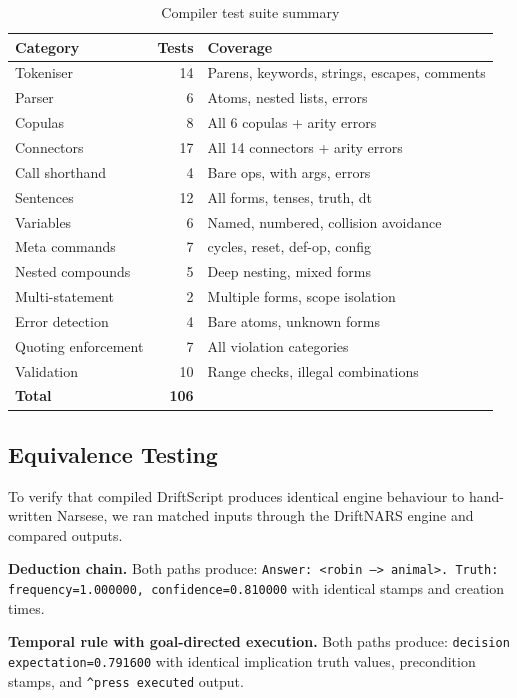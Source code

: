 \documentclass[11pt,a4paper]{article}
\begin{document}
\begin{table}[h]
\centering
\caption{Compiler test suite summary}
\label{tab:tests}
\begin{tabular}{lrl}
\toprule
\textbf{Category} & \textbf{Tests} & \textbf{Coverage} \\
\midrule
Tokeniser & 14 & Parens, keywords, strings, escapes, comments \\
Parser & 6 & Atoms, nested lists, errors \\
Copulas & 8 & All 6 copulas + arity errors \\
Connectors & 17 & All 14 connectors + arity errors \\
Call shorthand & 4 & Bare ops, with args, errors \\
Sentences & 12 & All forms, tenses, truth, dt \\
Variables & 6 & Named, numbered, collision avoidance \\
Meta commands & 7 & cycles, reset, def-op, config \\
Nested compounds & 5 & Deep nesting, mixed forms \\
Multi-statement & 2 & Multiple forms, scope isolation \\
Error detection & 4 & Bare atoms, unknown forms \\
Quoting enforcement & 7 & All violation categories \\
Validation & 10 & Range checks, illegal combinations \\
\midrule
\textbf{Total} & \textbf{106} & \\
\bottomrule
\end{tabular}
\end{table}

\subsection{Equivalence Testing}

To verify that compiled DriftScript produces identical engine behaviour to
hand-written Narsese, we ran matched inputs through the DriftNARS engine and
compared outputs.

\textbf{Deduction chain.} Both paths produce:
\texttt{Answer: <robin --> animal>. Truth: frequency=1.000000,
confidence=0.810000} with identical stamps and creation times.

\textbf{Temporal rule with goal-directed execution.} Both paths produce:
\texttt{decision expectation=0.791600} with identical implication truth values,
precondition stamps, and \texttt{\^{}press executed} output.
\end{document}
